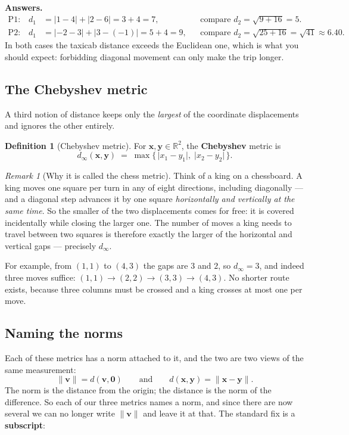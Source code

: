\documentclass[11pt]{article}
\theoremstyle{definition}
\newtheorem{defn}{Definition}
\theoremstyle{remark}
\newtheorem*{rmk}{Remark}
\newcommand{\R}{\mathbb{R}}
\newcommand{\vc}[1]{\mathbf{#1}}
\newcommand{\norm}[1]{\lVert #1\rVert}
\begin{document}
\smallskip
\noindent\textbf{Answers.}
\begin{align*}
  \text{P1:}\quad d_1 &= \lvert 1-4\rvert+\lvert 2-6\rvert = 3+4 = 7,
    &&\text{compare } d_2=\sqrt{9+16}=5 . \\
  \text{P2:}\quad d_1 &= \lvert -2-3\rvert+\lvert 3-(-1)\rvert = 5+4 = 9,
    &&\text{compare } d_2=\sqrt{25+16}=\sqrt{41}\approx 6.40 .
\end{align*}
In both cases the taxicab distance exceeds the Euclidean one, which is what you
should expect: forbidding diagonal movement can only make the trip longer.

\subsection{The Chebyshev metric}
A third notion of distance keeps only the \emph{largest} of the coordinate
displacements and ignores the other entirely.

\begin{defn}[Chebyshev metric]
For $\vc{x},\vc{y}\in\R^{2}$, the \textbf{Chebyshev} metric is
\[
  d_\infty(\vc{x},\vc{y})
  \;=\; \max\bigl\{\,\lvert x_1-y_1\rvert,\;\lvert x_2-y_2\rvert\,\bigr\}.
\]
\end{defn}

\begin{rmk}[Why it is called the chess metric]
Think of a king on a chessboard. A king moves one square per turn in any of
eight directions, including diagonally --- and a diagonal step advances it by
one square \emph{horizontally and vertically at the same time}. So the smaller
of the two displacements comes for free: it is covered incidentally while
closing the larger one. The number of moves a king needs to travel between two
squares is therefore exactly the larger of the horizontal and vertical gaps ---
precisely $d_\infty$.

For example, from $(1,1)$ to $(4,3)$ the gaps are $3$ and $2$, so
$d_\infty=3$, and indeed three moves suffice:
$(1,1)\to(2,2)\to(3,3)\to(4,3)$. No shorter route exists, because three columns
must be crossed and a king crosses at most one per move.
\end{rmk}

\subsection{Naming the norms}
Each of these metrics has a norm attached to it, and the two are two views of
the same measurement:
\[
  \norm{\vc{v}} = d(\vc{v},\vc{0})
  \qquad\text{and}\qquad
  d(\vc{x},\vc{y}) = \norm{\vc{x}-\vc{y}} .
\]
The norm is the distance from the origin; the distance is the norm of the
difference. So each of our three metrics names a norm, and since there are now
several we can no longer write $\norm{\vc{v}}$ and leave it at that. The
standard fix is a \textbf{subscript}:
\end{document}
